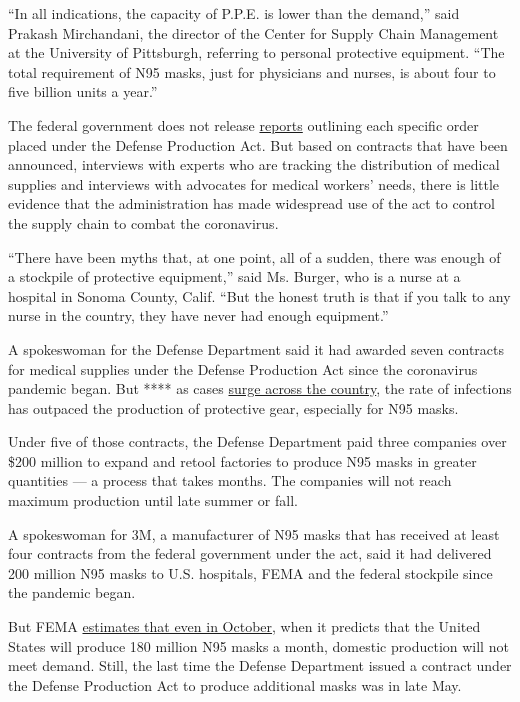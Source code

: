 ``In all indications, the capacity of P.P.E. is lower than the demand,''
said Prakash Mirchandani, the director of the Center for Supply Chain
Management at the University of Pittsburgh, referring to personal
protective equipment. ``The total requirement of N95 masks, just for
physicians and nurses, is about four to five billion units a year.''

The federal government does not release
\href{https://www.fema.gov/media-library-data/1582898704576-dc44bbe61cce3cf763cc8a6b92617188/2018_DPAC_Report_to_Congress.pdf}{reports}
outlining each specific order placed under the Defense Production Act.
But based on contracts that have been announced, interviews with experts
who are tracking the distribution of medical supplies and interviews
with advocates for medical workers' needs, there is little evidence that
the administration has made widespread use of the act to control the
supply chain to combat the coronavirus.

``There have been myths that, at one point, all of a sudden, there was
enough of a stockpile of protective equipment,'' said Ms. Burger, who is
a nurse at a hospital in Sonoma County, Calif. ``But the honest truth is
that if you talk to any nurse in the country, they have never had enough
equipment.''

A spokeswoman for the Defense Department said it had awarded seven
contracts for medical supplies under the Defense Production Act since
the coronavirus pandemic began. But **** as cases
\href{https://www.nytimes.com/interactive/2020/us/coronavirus-us-cases.html}{surge
across the country}, the rate of infections has outpaced the production
of protective gear, especially for N95 masks.

Under five of those contracts, the Defense Department paid three
companies over \$200 million to expand and retool factories to produce
N95 masks in greater quantities --- a process that takes months. The
companies will not reach maximum production until late summer or fall.

A spokeswoman for 3M, a manufacturer of N95 masks that has received at
least four contracts from the federal government under the act, said it
had delivered 200 million N95 masks to U.S. hospitals, FEMA and the
federal stockpile since the pandemic began.

But FEMA
\href{https://www.hassan.senate.gov/imo/media/doc/SCTF\%20Demand\%20PPE\%20Chart.pdf}{estimates
that even in October}, when it predicts that the United States will
produce 180 million N95 masks a month, domestic production will not meet
demand. Still, the last time the Defense Department issued a contract
under the Defense Production Act to produce additional masks was in late
May.

